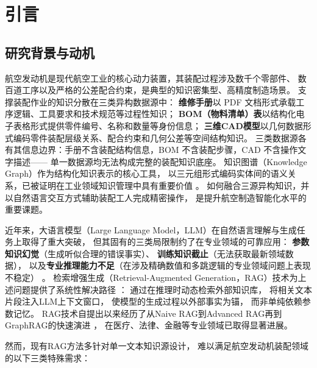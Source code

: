 \section{引言}
\label{sec:intro}

\subsection{研究背景与动机}
\label{sec:background}

航空发动机是现代航空工业的核心动力装置，其装配过程涉及数千个零部件、
数百道工序以及严格的公差配合约束，是典型的知识密集型、高精度制造场景。
支撑装配作业的知识分散在三类异构数据源中：
\textbf{维修手册}以 PDF 文档形式承载工序逻辑、工具要求和技术规范等过程性知识；
\textbf{BOM（物料清单）表}以结构化电子表格形式提供零件编号、名称和数量等身份信息；
\textbf{三维CAD模型}以几何数据形式编码零件装配层级关系、配合约束和几何公差等空间结构知识。
三类数据源各有其信息边界：手册不含装配结构信息，BOM 不含装配步骤，CAD 不含操作文字描述——
单一数据源均无法构成完整的装配知识底座。
知识图谱（Knowledge Graph）作为结构化知识表示的核心工具，
以三元组形式编码实体间的语义关系，已被证明在工业领域知识管理中具有重要价值
\cite{hogan2021kg,ji2022kgsurvey}。
如何融合三源异构知识，并以自然语言交互方式辅助装配工人完成精密操作，
是提升航空制造智能化水平的重要课题。

近年来，大语言模型（Large Language Model，LLM）在自然语言理解与生成任务上取得了重大突破，
但其固有的三类局限制约了在专业领域的可靠应用：
\textbf{参数知识幻觉}（生成听似合理的错误事实）、
\textbf{训练知识截止}（无法获取最新领域数据），
以及\textbf{专业推理能力不足}（在涉及精确数值和多跳逻辑的专业领域问题上表现不稳定）
\cite{zhao2023llmsurvey}。
检索增强生成（Retrieval-Augmented Generation，RAG）技术为上述问题提供了系统性解决路径
\cite{lewis2020rag}：
通过在推理时动态检索外部知识库，
将相关文本片段注入LLM上下文窗口，
使模型的生成过程以外部事实为锚，
而非单纯依赖参数记忆。
RAG技术自提出以来经历了从Naive RAG到Advanced RAG再到GraphRAG的快速演进
\cite{gao2023ragsurvey}，
在医疗、法律、金融等专业领域已取得显著进展。

然而，现有RAG方法多针对单一文本知识源设计，
难以满足航空发动机装配领域的以下三类特殊需求：

